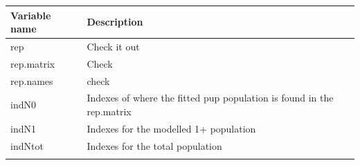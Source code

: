 \documentclass[
]{article}
\begin{document}
\begin{longtable}[]{@{}ll@{}}
\toprule
\begin{minipage}[b]{0.31\columnwidth}\raggedright
Variable name\strut
\end{minipage} & \begin{minipage}[b]{0.38\columnwidth}\raggedright
Description\strut
\end{minipage}\tabularnewline
\midrule
\endhead
\begin{minipage}[t]{0.31\columnwidth}\raggedright
rep\strut
\end{minipage} & \begin{minipage}[t]{0.38\columnwidth}\raggedright
Check it out\strut
\end{minipage}\tabularnewline
\begin{minipage}[t]{0.31\columnwidth}\raggedright
rep.matrix\strut
\end{minipage} & \begin{minipage}[t]{0.38\columnwidth}\raggedright
Check\strut
\end{minipage}\tabularnewline
\begin{minipage}[t]{0.31\columnwidth}\raggedright
rep.names\strut
\end{minipage} & \begin{minipage}[t]{0.38\columnwidth}\raggedright
check\strut
\end{minipage}\tabularnewline
\begin{minipage}[t]{0.31\columnwidth}\raggedright
indN0\strut
\end{minipage} & \begin{minipage}[t]{0.38\columnwidth}\raggedright
Indexes of where the fitted pup population is found in the
rep.matrix\strut
\end{minipage}\tabularnewline
\begin{minipage}[t]{0.31\columnwidth}\raggedright
indN1\strut
\end{minipage} & \begin{minipage}[t]{0.38\columnwidth}\raggedright
Indexes for the modelled 1+ population\strut
\end{minipage}\tabularnewline
\begin{minipage}[t]{0.31\columnwidth}\raggedright
indNtot\strut
\end{minipage} & \begin{minipage}[t]{0.38\columnwidth}\raggedright
Indexes for the total population\strut
\end{minipage}\tabularnewline
\begin{minipage}[t]{0.31\columnwidth}\raggedright

\end{minipage}
\end{longtable}
\end{document}

